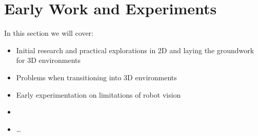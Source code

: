 \chapter{Early Work and Experiments}
In this section we will cover:
  \begin{itemize}
    \item Initial research and practical explorations in 2D and laying the groundwork for 3D environments
    \item Problems when transitioning into 3D environments
    \item Early experimentation on limitations of robot vision
    \item 
    \item \ldots
  \end{itemize}



